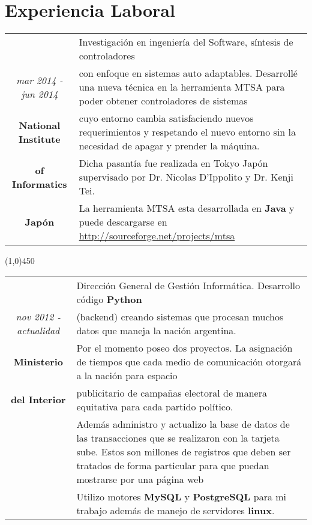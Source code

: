 \section{Experiencia Laboral}

\begin{tabular}{c|p{12.5cm}}
& \large Investigación en ingeniería del Software, síntesis de controladores \\
\large\textit{mar 2014 - jun 2014} &  \large con enfoque en sistemas auto adaptables. Desarrollé una nueva
técnica en la herramienta MTSA para poder obtener controladores de sistemas \\
\large\textbf{National Institute} & \large cuyo entorno cambia satisfaciendo nuevos requerimientos y respetando el nuevo
entorno sin la necesidad de apagar y prender la máquina. \\
\large\textbf{of Informatics} & \large  Dicha pasantía fue realizada en Tokyo Japón supervisado por
Dr. Nicolas D'Ippolito y Dr. Kenji Tei.\\
\large\textbf{Japón}  & \large La herramienta MTSA esta desarrollada en \textbf{Java} y puede
descargarse en \url{http://sourceforge.net/projects/mtsa}\\
\end{tabular}


\begin{center}
\line(1,0){450}
\end{center}
\begin{tabular}{c|p{12.5cm}}
& \large Dirección General de Gestión Informática. Desarrollo código \textbf{Python}\\
\large\textit{nov 2012 - actualidad} &  \large  (backend) creando sistemas que procesan muchos datos que maneja la nación argentina.\\
\large\textbf{Ministerio} & \large  Por el momento poseo dos proyectos. La asignación de tiempos que cada medio de comunicación otorgará a la nación para espacio\\
\large\textbf{del Interior} & \large  publicitario de campañas electoral de manera equitativa para cada partido político.\\
& \large Además administro y actualizo la base de datos de las transacciones que se realizaron con la tarjeta sube. Estos son millones de registros que deben ser tratados de forma particular para que puedan mostrarse por una página web\\
& \large Utilizo motores \textbf{MySQL} y \textbf{PostgreSQL} para mi trabajo además de manejo de servidores \textbf{linux}. \\
\end{tabular}


